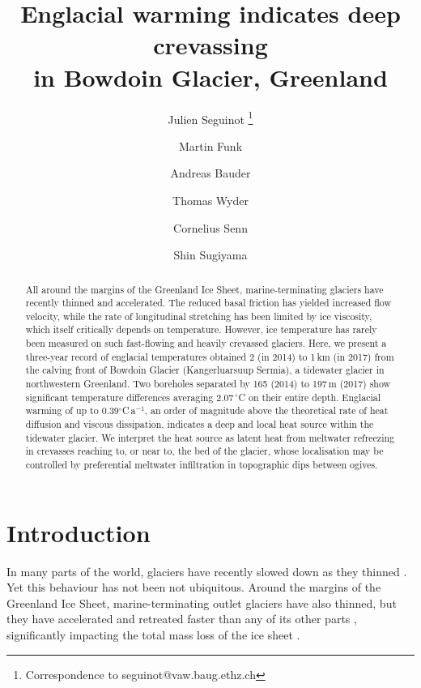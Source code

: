 \documentclass[utf8]{article}
\title{Englacial warming indicates deep crevassing\\
       in Bowdoin Glacier, Greenland}
\author[1]{Julien Seguinot
           \thanks{Correspondence to seguinot@vaw.baug.ethz.ch}}
\author[1]{Martin Funk}
\author[1]{Andreas Bauder}
\author[1]{Thomas Wyder}
\author[2]{Cornelius Senn}
\author[3]{Shin Sugiyama}
\affil[1]{Laboratory of Hydraulics, Hydrology and Glaciology,
          ETH Zürich, Switzerland}
\affil[2]{Department of Civil, Environmental and Geomatic Engineering,
          ETH Zürich, Switzerland}
\affil[3]{Institute of Low Temperature Science, Hokkaido University,
          Sapporo, Japan}
\begin{document}

\maketitle

\begin{abstract}

    All around the margins of the Greenland Ice Sheet, marine-terminating
    glaciers have recently thinned and accelerated. The reduced basal friction
    has yielded increased flow velocity, while the rate of longitudinal
    stretching has been limited by ice viscosity, which itself critically
    depends on temperature. However, ice temperature has rarely been measured
    on such fast-flowing and heavily crevassed glaciers.
    Here, we present a three-year record of englacial temperatures obtained
    2 (in 2014) to 1\,km (in 2017) from the calving front of Bowdoin
    Glacier (Kangerluarsuup Sermia), a
    tidewater glacier in northwestern Greenland. Two boreholes separated by 165
    (2014) to 197\,m (2017) show significant temperature differences averaging
    2.07\,$^\circ$C on their entire depth. Englacial warming of up to
    0.39$^\circ$C\,a$^{-1}$, an order of magnitude above the theoretical rate
    of heat diffusion and viscous dissipation, indicates a deep and local heat
    source within the tidewater glacier.
    We interpret the heat source as latent heat from meltwater refreezing in
    crevasses reaching to, or near to, the bed of the glacier, whose localisation
    may be controlled by preferential meltwater infiltration
    in topographic dips between ogives.

\end{abstract}

\section{Introduction}

    In many parts of the world, glaciers have recently slowed down as they
    thinned \citep{Heid.Kaab.2012, Dehecq.etal.2019}. Yet this behaviour has
    not been not ubiquitous. Around the margins of the Greenland Ice Sheet,
    marine-terminating outlet glaciers have also thinned, but they have
    accelerated and retreated faster than any of its other parts
    \citep[e.g.,][]{Krabill.etal.2000, Rignot.Kanagaratnam.2006,
    Pritchard.etal.2009, Moon.etal.2012, Moon.etal.2015, Hill.etal.2017},
    significantly impacting the total
    mass loss of the ice sheet \citep[e.g.,][]{Enderlin.etal.2014,
    Khan.etal.2015, McMillan.etal.2016}.
\end{document}
